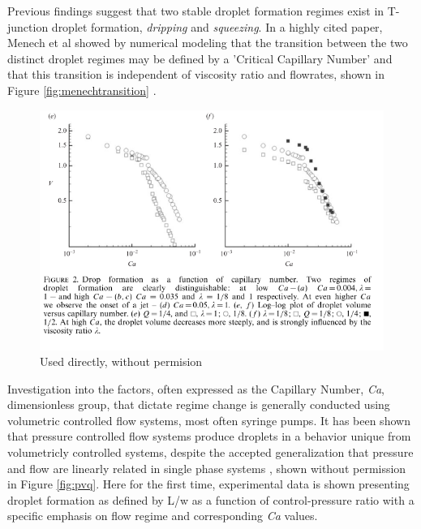 Previous findings suggest that two stable droplet formation regimes exist in T-junction droplet formation, \emph{dripping} and \emph{squeezing}. In a highly cited paper, Menech et al showed by numerical modeling that the transition between the two distinct droplet regimes may be defined by a 'Critical Capillary Number' and that this transition is independent of viscosity ratio and flowrates, shown in Figure \vref{fig:menechtransition} \cite{DeMenech2008}. 

\begin{figure}[H]
\centering 
\includegraphics[width=1.0\columnwidth]{menechtransition.PNG} 
\caption[Menech Regime Transition]{Used directly, without permision} 
\label{fig:menechtransition} 
\end{figure}


Investigation into the factors, often expressed as the Capillary Number, \emph{Ca}, dimensionless group, that dictate regime change is generally conducted using volumetric controlled flow systems, most often syringe pumps. It has been shown that pressure controlled flow systems produce droplets in a behavior unique from volumetricly controlled systems, despite the accepted generalization that pressure and flow are linearly related in single phase systems \cite{Ward2005}, shown without permission in Figure \vref{fig:pvq}. Here for the first time, experimental data is shown presenting droplet formation as defined by L/w as a function of control-pressure ratio with a specific emphasis on flow regime and corresponding \emph{Ca} values.

